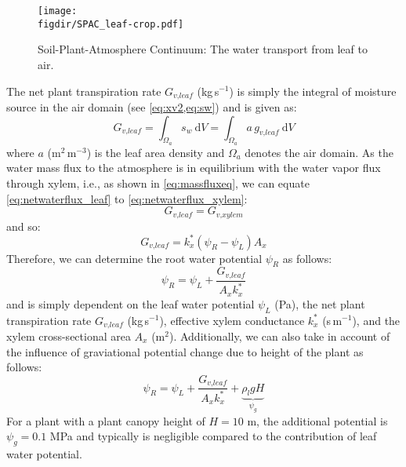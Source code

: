 \begin{figure}[t]
	\centering
	\texttt{[image: \\figdir/SPAC\_leaf-crop.pdf]}
	\caption{Soil-Plant-Atmosphere Continuum: The water transport from leaf to air.}
	\label{fig:SPAC_leaf}
\end{figure}

The net plant transpiration rate $G_{\textit{v,leaf}}$ (kg\,s$^{-1}$) is simply the integral of moisture source in the air domain (see \cref{eq:xv2,eq:sw}) and is given as:
\begin{equation}
G_{\textit{v,leaf}} = \int_{\Omega_a} s_w~\mathrm{d}V = \int_{\Omega_a} a\,g_{\textit{v,leaf}}~\mathrm{d}V
\label{eq:netwaterflux_leaf}
\end{equation}
where $a$ (m$^2$\,m$^{-3}$) is the leaf area density and $\Omega_a$ denotes the air domain. As the water mass flux to the atmosphere is in equilibrium with the water vapor flux through xylem, i.e., as shown in \cref{eq:massfluxeq}, we can equate \cref{eq:netwaterflux_leaf} to \cref{eq:netwaterflux_xylem}:
\begin{equation}
G_{\textit{v,leaf}} = G_{\textit{v,xylem}}
\end{equation}
and so:
\begin{equation}
G_{\textit{v,leaf}} = k_x^* \left( \psi_R - \psi_L \right) A_x
\end{equation}
Therefore, we can determine the root water potential $\psi_R$ as follows:
\begin{equation}
\psi_R = \psi_L  + \frac{G_{\textit{v,leaf}}}{A_x k_x^*}
\end{equation}
and is simply dependent on the leaf water potential $\psi_L$ (Pa), the net plant transpiration rate $G_{\textit{v,leaf}}$ (kg\,s$^{-1}$), effective xylem conductance $k_x^*$ (s\,m$^{-1}$), and the xylem cross-sectional area $A_x$ (m$^2$). Additionally, we can also take in account of the influence of graviational potential change due to height of the plant as follows:
\begin{equation}
\psi_R = \psi_L  + \frac{G_{\textit{v,leaf}}}{A_x k_x^*} + \underbrace{\rho_l g H}_{\psi_g}
\end{equation}
For a plant with a plant canopy height of $H = 10$ m, the additional potential is $\psi_g = 0.1$ MPa and typically is negligible compared to the contribution of leaf water potential.

